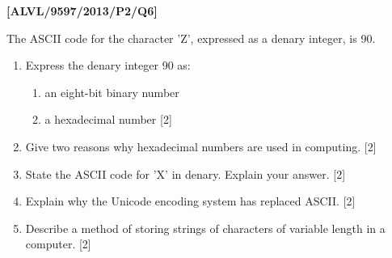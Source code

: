 \item \textbf{{[}ALVL/9597/2013/P2/Q6{]} }

The ASCII code for the character 'Z', expressed as a denary integer,
is 90.
\begin{enumerate}
\item Express the denary integer 90 as:
\begin{enumerate}
\item an eight-bit binary number
\item a hexadecimal number \hfill{}{[}2{]}
\end{enumerate}
\item Give two reasons why hexadecimal numbers are used in computing. \hfill{}{[}2{]}
\item State the ASCII code for 'X' in denary. Explain your answer.\hfill{}
{[}2{]}
\item Explain why the Unicode encoding system has replaced ASCII. \hfill{}{[}2{]}
\item Describe a method of storing strings of characters of variable length
in a computer. \hfill{}{[}2{]}
\end{enumerate}